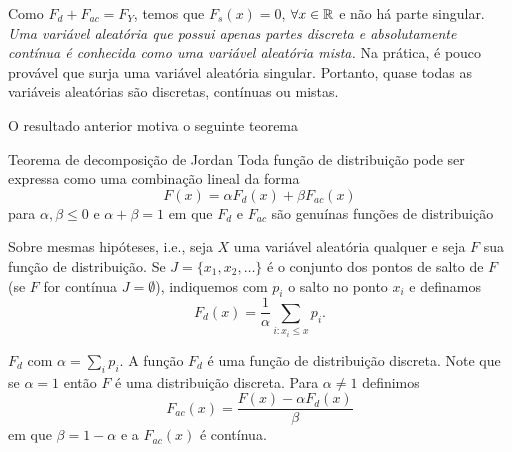 \begin{frame}
Como $F_d+F_{ac}=F_Y$, temos que $F_s(x)=0$, $\forall x\in\mathbb{R}$ e não há parte singular. {\em Uma variável aleatória que possui apenas partes discreta e absolutamente contínua é conhecida como uma variável aleatória mista.} Na prática, é pouco provável que surja uma variável aleatória singular. Portanto, quase todas as variáveis aleatórias são discretas, contínuas ou mistas.	

O resultado anterior motiva o seguinte teorema
\begin{block}{Teorema de decomposição de Jordan}
	Toda função de distribuição pode ser expressa como uma combinação lineal da forma 
	$$F(x)=\alpha F_d(x)+\beta F_{ac}(x)$$
	para $\alpha, \beta \leq 0$ e $\alpha+\beta=1$ em que $F_d$ e $F_{ac}$ são genuínas funções de distribuição
\end{block}	
Sobre mesmas hipóteses, i.e., seja $X$ uma variável aleatória qualquer e seja $F$ sua função de distribuição. Se $J=\{x_1,x_2,\ldots\}$ é o conjunto dos pontos de salto de $F$ (se $F$ for contínua $J=\emptyset$), indiquemos com $p_i$ o salto no ponto $x_i$ e definamos 
$$F_d(x)=\frac{1}{\alpha}\sum_{i:x_i\leq x}p_i.$$ 

$F_d$ com $\alpha=\sum_{i}p_i.$ A função $F_d$ é uma função de distribuição discreta. Note que se $\alpha=1$ então $F$ é uma distribuição discreta. Para $\alpha\neq 1$ definimos 
$$
 F_{ac}(x) = \frac{F(x) - \alpha F_d(x)}{\beta}
$$
em que $\beta=1-\alpha$ e a $F_{ac}(x)$  é contínua.
\end{frame}	


